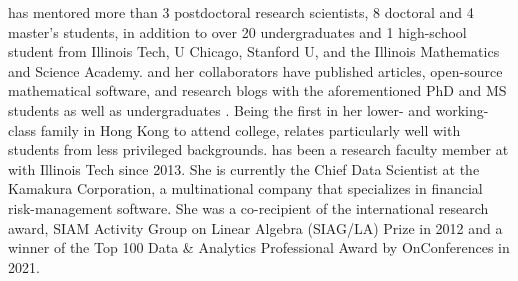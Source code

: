 has mentored more than 3 postdoctoral research scientists, 8 doctoral and 4 master’s students, in addition to over 20 undergraduates and 1 high-school student from Illinois Tech, U Chicago, Stanford U, and the Illinois Mathematics and Science Academy. \SCTC and her collaborators have published articles, open-source mathematical software, and research blogs with the aforementioned PhD and MS students \cite{ChoEtal22a,QMCPy2020a,QMCBlog,
ChoEtal20a,WCCR18,ChoEtal17a} as well as undergraduates \cite{QMCPy2020a,QMCBlog,PCLD21,ZLWC21}. Being the first in her lower- and working-class family in Hong Kong to attend college, \SCTC relates particularly well with students from less privileged backgrounds. \SCTC has been a research faculty member at with Illinois Tech since 2013. She is currently the Chief Data Scientist at the Kamakura Corporation, a multinational company that specializes in financial risk-management software.  She was a co-recipient of the international research award, SIAM Activity Group on Linear Algebra (SIAG/LA) Prize in 2012 and  a winner of the Top 100 Data \& Analytics Professional Award by OnConferences in 2021. 

